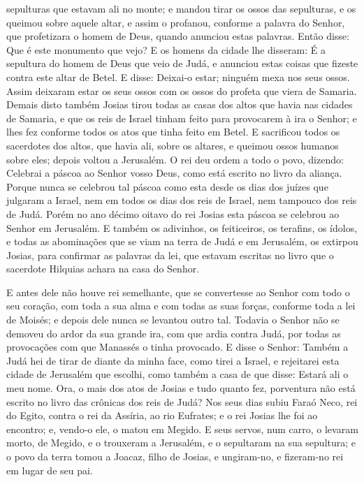 sepulturas que estavam ali no monte; e mandou tirar os ossos das
sepulturas, e os queimou sobre aquele altar, e assim o profanou,
conforme a palavra do Senhor, que profetizara o homem de Deus,
quando anunciou estas palavras. Então disse: Que é este
monumento que vejo? E os homens da cidade lhe disseram: É a
sepultura do homem de Deus que veio de Judá, e anunciou estas coisas
que fizeste contra este altar de Betel. E disse: Deixai-o
estar; ninguém mexa nos seus ossos. Assim deixaram estar os seus
ossos com os ossos do profeta que viera de Samaria. Demais
disto também Josias tirou todas as casas dos altos que havia nas
cidades de Samaria, e que os reis de Israel tinham feito para
provocarem à ira o Senhor; e lhes fez conforme todos os atos que
tinha feito em Betel. E sacrificou todos os sacerdotes dos
altos, que havia ali, sobre os altares, e queimou ossos humanos
sobre eles; depois voltou a Jerusalém. O rei deu ordem a todo
o povo, dizendo: Celebrai a páscoa ao Senhor vosso Deus, como está
escrito no livro da aliança. Porque nunca se celebrou tal
páscoa como esta desde os dias dos juízes que julgaram a Israel, nem
em todos os dias dos reis de Israel, nem tampouco dos reis de Judá.
Porém no ano décimo oitavo do rei Josias esta páscoa se
celebrou ao Senhor em Jerusalém. E também os adivinhos, os
feiticeiros, os terafins, os ídolos, e todas as abominações que se
viam na terra de Judá e em Jerusalém, os extirpou Josias, para
confirmar as palavras da lei, que estavam escritas no livro que o
sacerdote Hilquias achara na casa do Senhor.

E antes dele não houve rei semelhante, que se convertesse ao
Senhor com todo o seu coração, com toda a sua alma e com todas as
suas forças, conforme toda a lei de Moisés; e depois dele nunca se
levantou outro tal. Todavia o Senhor não se demoveu do ardor
da sua grande ira, com que ardia contra Judá, por todas as
provocações com que Manassés o tinha provocado. E disse o
Senhor: Também a Judá hei de tirar de diante da minha face, como
tirei a Israel, e rejeitarei esta cidade de Jerusalém que escolhi,
como também a casa de que disse: Estará ali o meu nome. Ora,
o mais dos atos de Josias e tudo quanto fez, porventura não está
escrito no livro das crônicas dos reis de Judá? Nos seus dias
subiu Faraó Neco, rei do Egito, contra o rei da Assíria, ao rio
Eufrates; e o rei Josias lhe foi ao encontro; e, vendo-o ele, o
matou em Megido. E seus servos, num carro, o levaram morto,
de Megido, e o trouxeram a Jerusalém, e o sepultaram na sua
sepultura; e o povo da terra tomou a Joacaz, filho de Josias, e
ungiram-no, e fizeram-no rei em lugar de seu pai.

